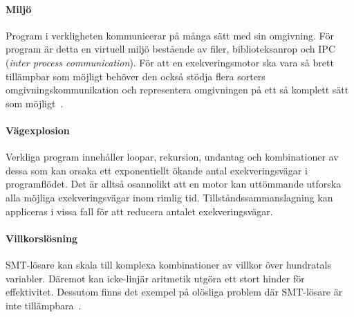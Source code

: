 \paragraph{Miljö} Program i verkligheten kommunicerar på många sätt med sin
omgivning. För program är detta en virtuell miljö bestående av filer,
biblioteksanrop och IPC (\emph{inter process communication}). För att en
exekveringsmotor ska vara så brett tillämpbar som möjligt behöver den
också stödja flera sorters omgivningskommunikation och representera omgivningen
på ett så komplett sätt som möjligt~\cite{survey_symb_exc}.

\paragraph{Vägexplosion} Verkliga program innehåller loopar, rekursion,
undantag och kombinationer av dessa som kan orsaka ett exponentiellt ökande
antal exekveringsvägar i programflödet. Det är alltså osannolikt att en motor
kan uttömmande utforska alla möjliga exekveringsvägar inom rimlig tid.
Tillståndssammanslagning kan appliceras i vissa fall för att reducera antalet
exekveringsvägar.

\paragraph{Villkorslösning} SMT-lösare kan skala till komplexa kombinationer av
villkor över hundratals variabler. Däremot kan icke-linjär aritmetik utgöra ett
stort hinder för effektivitet. Dessutom finns det exempel på olösliga problem
där SMT-lösare är inte tillämpbara~\cite{survey_symb_exc}.

